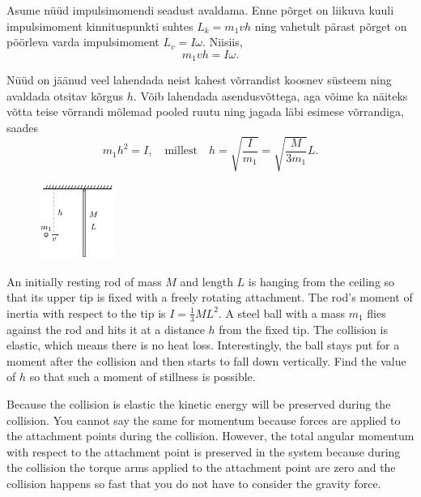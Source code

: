 Asume nüüd impulsimomendi seadust avaldama. Enne põrget on liikuva kuuli impulsimoment kinnituspunkti suhtes $L_k=m_1vh$ ning vahetult pärast põrget on pöörleva varda impulsimoment $L_v=I\omega$. Niisiis,
\[
m_1vh=I\omega.
\]

Nüüd on jäänud veel lahendada neist kahest võrrandist koosnev süsteem ning avaldada otsitav kõrgus $h$. Võib lahendada asendusvõttega, aga võime ka näiteks võtta teise võrrandi mõlemad pooled ruutu ning jagada läbi esimese võrrandiga, saades
\[
m_1h^2 = I,\quad \text{millest} \quad h = \sqrt{\frac{I}{m_1}}=\sqrt{\frac{M}{3m_1}}L.
\]

\begin{figure}
\includegraphics[width=0.22\textwidth]{2015-v2g-06-porgejoonis}
\end{figure}
An initially resting rod of mass $M$ and length $L$ is hanging from the ceiling so that its upper tip is fixed with a freely rotating attachment. The rod’s moment of inertia with respect to the tip is $I=\frac{1}{3}ML^2$. A steel ball with a mass $m_1$ flies against the rod and hits it at a distance $h$ from the fixed tip. The collision is elastic, which means there is no heat loss. Interestingly, the ball stays put for a moment after the collision and then starts to fall down vertically. Find the value of $h$ so that such a moment of stillness is possible.

\hinteng
Because the collision is elastic the kinetic energy will be preserved during the collision. You cannot say the same for momentum because forces are applied to the attachment points during the collision. However, the total angular momentum with respect to the attachment point is preserved in the system because during the collision the torque arms applied to the attachment point are zero and the collision happens so fast that you do not have to consider the gravity force.

